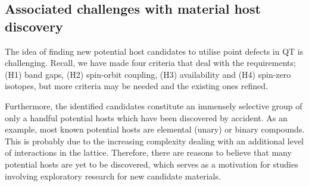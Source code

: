 \subsection{Associated challenges with material host discovery}

The idea of finding new potential host candidates to utilise point defects in QT is challenging. Recall, we have made four criteria that deal with the requirements; (H1) band gaps, (H2) spin-orbit coupling, (H3) availability and (H4) spin-zero isotopes, but more criteria may be needed and the existing ones refined.%

Furthermore, the identified candidates constitute an immensely selective group of only a handful potential hosts which have been discovered by accident. As an example, most known potential hosts are elemental (unary) or binary compounds. This is probably due to the increasing complexity dealing with an additional level of interactions in the lattice. Therefore, there are reasons to believe that many potential hosts are yet to be discovered, which serves as a motivation for studies involving exploratory research for new candidate materials.






\clearpage
